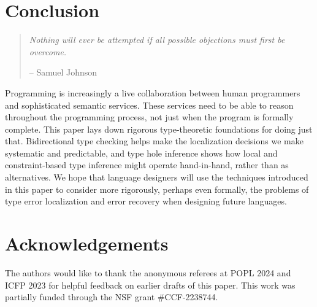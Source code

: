\section{Conclusion}
\label{sec:conclusion}

\begin{quote}
    \emph{Nothing will ever be attempted if all possible objections must first be overcome.} 
    \begin{flushright}-- Samuel Johnson\end{flushright}
\end{quote}

Programming is increasingly a live collaboration between human programmers and sophisticated semantic services. These services need to be able to reason throughout the programming process, not just when the program is formally complete. This paper lays down rigorous type-theoretic foundations for doing just that. Bidirectional type checking helps make the localization decisions we make systematic and predictable, and type hole inference shows how local and constraint-based type inference might operate hand-in-hand, rather than as alternatives. 
We hope that language designers will use the techniques introduced in this paper to consider more rigorously, perhaps even formally, the problems of type error localization and error recovery when designing future languages. 

\section*{Acknowledgements}
The authors would like to thank the anonymous referees at POPL 2024 and ICFP 2023 for helpful feedback on earlier drafts of this paper.
This work was partially funded through the NSF grant #CCF-2238744.

